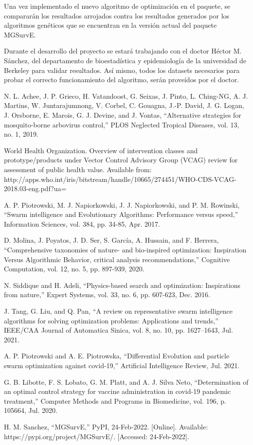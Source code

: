 \documentclass[letterpaper, 10pt, conference]{ieeeconf}
\begin{document}
  Una vez implementado el nuevo algoritmo de optimización en el paquete, se
  compararán los resultados arrojados contra los resultados generados por los
  algoritmos genéticos que se encuentran en la versión actual del paquete
  MGSurvE. 

  Durante el desarrollo del proyecto se estará trabajando con el doctor Héctor
  M. Sánchez, del departamento de bioestadística y epidemiología de la
  universidad de Berkeley para validar resultados.
  Así mismo, todos los datasets necesarios para probar el correcto
  funcionamiento del algoritmo, serán proveídos por el doctor.

\begin{thebibliography}{99}
  N. L. Achee, J. P. Grieco, H. Vatandoost, G. Seixas, J. Pinto, L. Ching-NG, A. J. Martins, W. Juntarajumnong, V. Corbel, C. Gouagna, J.-P. David, J. G. Logan, J. Orsborne, E. Marois, G. J. Devine, and J. Vontas, “Alternative strategies for mosquito-borne arbovirus control,” PLOS Neglected Tropical Diseases, vol. 13, no. 1, 2019. 
  
  World Health Organization. Overview of intervention classes and prototype/products under Vector Control Advisory Group (VCAG) review for assessment of public health value. Available from: http://apps.who.int/iris/bitstream/handle/10665/274451/WHO-CDS-VCAG-2018.03-eng.pdf?ua=

  A. P. Piotrowski, M. J. Napiorkowski, J. J. Napiorkowski, and P. M. Rowinski, “Swarm intelligence and Evolutionary Algorithms: Performance versus speed,” Information Sciences, vol. 384, pp. 34-85, Apr. 2017.  

  D. Molina, J. Poyatos, J. D. Ser, S. García, A. Hussain, and F. Herrera, “Comprehensive taxonomies of nature- and bio-inspired optimization: Inspiration Versus Algorithmic Behavior, critical analysis recommendations,” Cognitive Computation, vol. 12, no. 5, pp. 897-939, 2020. 

  N. Siddique and H. Adeli, “Physics-based search and optimization: Inspirations from nature,” Expert Systems, vol. 33, no. 6, pp. 607-623, Dec. 2016. 

  J. Tang, G. Liu, and Q. Pan, “A review on representative swarm intelligence algorithms for solving optimization problems: Applications and trends,” IEEE/CAA Journal of Automatica Sinica, vol. 8, no. 10, pp. 1627–1643, Jul. 2021.

  A. P. Piotrowski and A. E. Piotrowska, “Differential Evolution and particle swarm optimization against covid-19,” Artificial Intelligence Review, Jul. 2021. 

  G. B. Libotte, F. S. Lobato, G. M. Platt, and A. J. Silva Neto, “Determination of an optimal control strategy for vaccine administration in covid-19 pandemic treatment,” Computer Methods and Programs in Biomedicine, vol. 196, p. 105664, Jul. 2020. 
  
  H. M. Sanchez, “MGSurvE,” PyPI, 24-Feb-2022. [Online]. Available: https://pypi.org/project/MGSurvE/. [Accessed: 24-Feb-2022]. 
\end{thebibliography}
\end{document}

